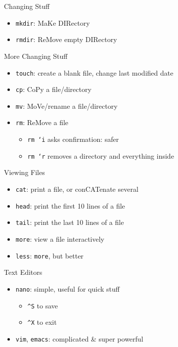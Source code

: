 \documentclass[pdf,usenames,dvipsnames,14pt]{beamer}%
\newcommand\hyphen{\char`\-}
\newcommand\textasciicaret{\textasciicircum}
\begin{document}
\begin{frame}{Changing Stuff}
	\begin{itemize}
		\item \texttt{mkdir}: MaKe DIRectory
		\item \texttt{rmdir}: ReMove empty DIRectory
	\end{itemize}
\end{frame}

\begin{frame}{More Changing Stuff}
	\begin{itemize}
		\item \texttt{touch}: create a blank file, change last modified date
		\item \texttt{cp}: CoPy a file/directory
		\item \texttt{mv}: MoVe/rename a file/directory
		\item \texttt{rm}: ReMove a file
		\begin{itemize}
			\item \texttt{rm \hyphen i} asks confirmation: safer
			\item \texttt{rm \hyphen r} removes a directory and everything inside
		\end{itemize}
	\end{itemize}
\end{frame}

\begin{frame}{Viewing Files}
	\begin{itemize}
		\item \texttt{cat}: print a file, or conCATenate several
		\item \texttt{head}: print the first 10 lines of a file
		\item \texttt{tail}: print the last 10 lines of a file
		\item \texttt{more}: view a file interactively
		\item \texttt{less}: \texttt{more}, but better
	\end{itemize}
\end{frame}

\begin{frame}{Text Editors}
	\begin{itemize}
		\item \texttt{nano}: simple, useful for quick stuff
		\begin{itemize}
			\item \texttt{\textasciicaret S} to save
			\item \texttt{\textasciicaret X} to exit
		\end{itemize}
		\item \texttt{vim}, \texttt{emacs}: complicated \& super powerful
	\end{itemize}
\end{frame}
\end{document}

